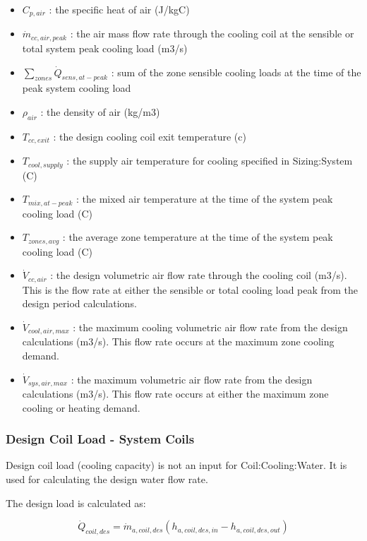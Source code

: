\begin{itemize}
\item
  \(C_{p,air}\) : the specific heat of air (J/kgC)
\item
  \(\dot{m}_{cc,air,peak}\) : the air mass flow rate through the cooling coil at the sensible or total system peak cooling load (m3/s)
\item
  \(\sum_{zones}\dot{Q}_{sens,at-peak}\) : sum of the zone sensible cooling loads at the time of the peak system cooling load
\item
  \(\rho_{air}\) : the density of air (kg/m3)
\item
  \(T_{cc,exit}\) : the design cooling coil exit temperature (c)
\item
  \(T_{cool,supply}\) : the supply air temperature for cooling specified in Sizing:System (C)
\item
  \(T_{mix,at-peak}\) : the mixed air temperature at the time of the system peak cooling load (C)
\item
  \(T_{zones,avg}\) : the average zone temperature at the time of the system peak cooling load (C)
\item
  \(\dot{V}_{cc,air}\) : the design volumetric air flow rate through the cooling coil (m3/s). This is the flow rate at either the sensible or total cooling load peak from the design period calculations.
\item
  \(\dot{V}_{cool,air,max}\) : the maximum cooling volumetric air flow rate from the design calculations (m3/s). This flow rate occurs at the maximum zone cooling demand.
\item
  \(\dot{V}_{sys,air,max}\) : the maximum volumetric air flow rate from the design calculations (m3/s). This flow rate occurs at either the maximum zone cooling or heating demand.
\end{itemize}

\subsubsection{Design Coil Load - System Coils}\label{design-coil-load---system-coils}

Design coil load (cooling capacity) is not an input for Coil:Cooling:Water. It is used for calculating the design water flow rate.

The design load is calculated as:

\begin{equation}
\dot{Q}_{coil,des} = \dot{m}_{a,coil,des}\left(h_{a,coil,des,in}-h_{a,coil,des,out}\right)
\end{equation}

